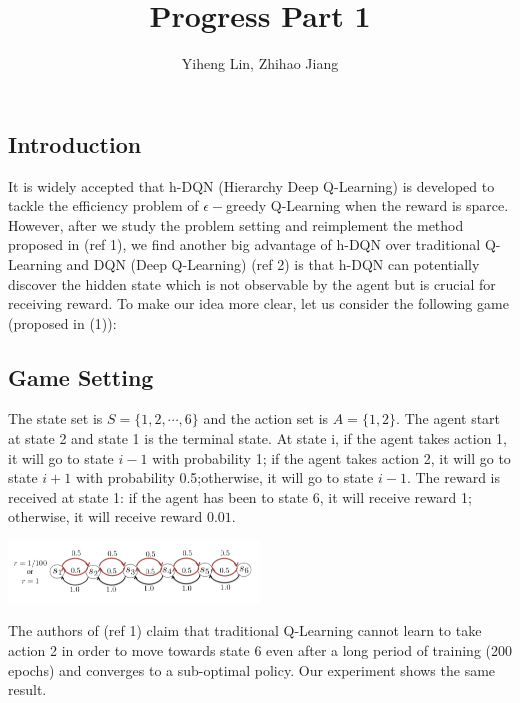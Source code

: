 \documentclass{article}
\title{\textmd{\bf Progress Part 1}}
\date{}
\author{Yiheng Lin, Zhihao Jiang}
\begin{document}
    \begin{spacing}{1.1}
    \maketitle %

    \section*{Introduction}
    It is widely accepted that h-DQN (Hierarchy Deep Q-Learning) is developed to tackle the efficiency problem of $\epsilon -$greedy Q-Learning when the reward is sparce. However, after we study the problem setting and reimplement the method proposed in (ref 1), we find another big advantage of h-DQN over traditional Q-Learning and DQN (Deep Q-Learning) (ref 2) is that h-DQN can potentially discover the hidden state which is not observable by the agent but is crucial for receiving reward. To make our idea more clear, let us consider the following game (proposed in (1)):
    \subsection*{Game Setting}
    The state set is $S = \{1, 2, \cdots, 6\}$ and the action set is $A = \{1, 2\}$. The agent start at state 2 and state 1 is the terminal state. At state i, if the agent takes action 1, it will go to state $i-1$ with probability 1; if the agent takes action 2, it will go to state $i+1$ with probability 0.5;otherwise, it will go to state $i-1$. The reward is received at state 1: if the agent has been to state 6, it will receive reward 1; otherwise, it will receive reward $0.01$.

    \begin{center}
        \includegraphics[width = 0.5\textwidth]{game.png}
    \end{center}

    The authors of (ref 1) claim that traditional Q-Learning cannot learn to take action 2 in order to move towards state 6 even after a long period of training (200 epochs) and converges to a sub-optimal policy. Our experiment shows the same result. 
    

\end{spacing}
\end{document}
